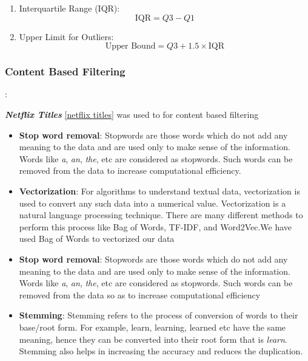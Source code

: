 \documentclass[a4paper,10pt]{article}
\begin{document}
\begin{enumerate}
  \item Interquartile Range (IQR):
    \[ \text{IQR} = Q3 - Q1 \]

  \item Upper Limit for Outliers:
    \[ \text{Upper Bound} = Q3 + 1.5 \times \text{IQR} \]
\end{enumerate}

\subsubsection{Content Based Filtering}:

\textbf{\textit{Netflix Titles}} \ref{netflix titles} was used to for content based filtering

\begin{itemize}
    \item \textbf{Stop word removal}: Stopwords are those words which do not add any meaning to the data and are used only to make sense of the information. Words like \textit{a}, \textit{an}, \textit{the}, etc are considered as stopwords. Such words can be removed from the data to increase computational efficiency. 
\end{itemize}


\begin{itemize}
    \item \textbf{Vectorization}: For algorithms to understand textual data, vectorization is used to convert any such data into a numerical value. Vectorization is a natural language processing technique. There are many different methods to perform this process like Bag of Words, TF-IDF, and Word2Vec.We have used Bag of Words to vectorized our data
\end{itemize}

\begin{itemize}
    \item \textbf{Stop word removal}: Stopwords are those words which do not add any meaning to the data and are used only to make sense of the information. Words like \textit{a}, \textit{an}, \textit{the}, etc are considered as stopwords. Such words can be removed from the data so as to increase computational efficiency
\end{itemize}

\begin{itemize}
    \item \textbf{Stemming}: Stemming refers to the process of conversion of words to their base/root form. For example, learn, learning, learned etc have the same meaning, hence they can be converted into their root form that is \textit{learn}. Stemming also helps in increasing the accuracy and reduces the duplication. 
\end{itemize}
\end{document}
